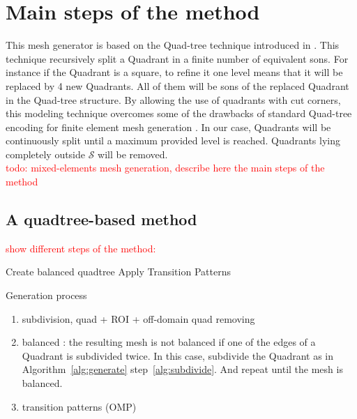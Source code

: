 \documentclass[10pt]{article}
\begin{document}
\section{Main steps of the method}
\label{sec:method}
This mesh generator is based on the Quad-tree technique introduced in \cite{Finkel1974}. This technique recursively split a Quadrant in a finite number of equivalent sons. For instance if the Quadrant is a square, to refine it one level means that it will be replaced by 4 new Quadrants. All of them will be sons of the replaced Quadrant in the Quad-tree structure. By allowing the use of quadrants with cut corners, this modeling technique overcomes some of the drawbacks of standard Quad-tree encoding for finite element mesh generation \cite{Yerry1983}.
In our case, Quadrants will be continuously split until a maximum provided level is reached. Quadrants lying completely outside $\mathcal{S}$ will be removed.\\

\textcolor{red}{todo: mixed-elements mesh generation, describe here the main steps of the method}

\subsection{A quadtree-based method}
\textcolor{red}{show different steps of the method: }

\begin{algorithm}[H]
\SetAlgoLined
{}
 \nl {}
\nl Create balanced quadtree\; \label{alg:goto}
 \nl Apply Transition Patterns\; \label{alg:trans}
 \caption{Generation process}
 \label{alg:generate}
\end{algorithm}


\begin{enumerate}
\item subdivision, quad + ROI + off-domain quad removing
\item balanced : the resulting mesh is not balanced if one of the edges of a Quadrant is subdivided twice. In this case, subdivide the Quadrant as in Algorithm~\ref{alg:generate} step~\ref{alg:subdivide}. And repeat until the mesh is balanced.
\item transition patterns (OMP)
\end{enumerate}
\end{document}
